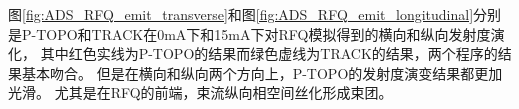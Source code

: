 图\ref{fig:ADS_RFQ_emit_transverse}和图\ref{fig:ADS_RFQ_emit_longitudinal}分别是P-TOPO和TRACK在0mA下和15mA下对RFQ模拟得到的横向和纵向发射度演化，
其中红色实线为P-TOPO的结果而绿色虚线为TRACK的结果，两个程序的结果基本吻合。
但是在横向和纵向两个方向上，P-TOPO的发射度演变结果都更加光滑。
尤其是在RFQ的前端，束流纵向相空间丝化形成束团。


